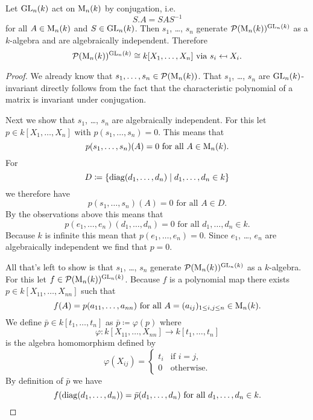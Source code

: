 \begin{thrm}
  Let $\operatorname{GL}_n(k)$ act on $\operatorname{M}_n(k)$ by conjugation, i.e.\
  \[
      S.A
    = SAS^{-1}
  \]
  for all $A \in \operatorname{M}_n(k)$ and $S \in \operatorname{GL}_n(k)$.
  Then $s_1$, \dots, $s_n$ generate $\mathcal{P}(\operatorname{M}_n(k))^{\operatorname{GL}_n(k)}$ as a $k$-algebra and are algebraically independent.
  Therefore
  \[
              \mathcal{P}(\operatorname{M}_n(k))^{\operatorname{GL}_n(k)}
    \cong     k[X_1, \dotsc, X_n]
    \text{ via }
              s_i
    \mapsfrom X_i.
  \]
\end{thrm}
\begin{proof}
  We already know that $s_1, \dotsc, s_n \in \mathcal{P}(\operatorname{M}_n(k))$.
  That $s_1$, \dots, $s_n$ are $\operatorname{GL}_n(k)$-invariant directly follows from the fact that the characteristic polynomial of a matrix is invariant under conjugation.
  
  Next we show that $s_1$, \dots, $s_n$ are algebraically independent.
  For this let $p \in k[X_1, \dotsc, X_n]$ with $p(s_1, \dotsc, s_n) = 0$.
  This means that
  \[
        p(s_1, \dotsc, s_n)(A)
    =   0
    \text{ for all }
        A
    \in \operatorname{M}_n(k).
  \]
  For
  \[
              D
    \coloneqq \{
                \operatorname{diag}(d_1, \dotsc, d_n)
              \mid
                    d_1, \dotsc, d_n
                \in k
              \}
  \]
  we therefore have
  \[
      p(s_1, \dotsc, s_n)(A)
    = 0
    \text{ for all }
        A
    \in D.
  \]
  By the observations above this means that 
  \[
      p(e_1, \dotsc, e_n)(d_1, \dotsc, d_n)
    = 0
    \text{ for all }
        d_1, \dotsc, d_n
    \in k.
  \]
  Because $k$ is infinite this mean that $p(e_1, \dotsc, e_n) = 0$.
  Since $e_1$, \dots, $e_n$ are algebraically independent we find that $p =0$.
  
  All that’s left to show is that $s_1$, \dots, $s_n$ generate $\mathcal{P}(\operatorname{M}_n(k))^{\operatorname{GL}_n(k)}$ as a $k$-algebra.
  For this let $f \in \mathcal{P}(\operatorname{M}_n(k))^{\operatorname{GL}_n(k)}$.
  Because $f$ is a polynomial map there exists $p \in k[X_{11}, \dotsc, X_{nn}]$ such that
  \[
      f(A)
    = p(a_{11}, \dotsc, a_{nn})
    \text{ for all }
        A
    =   (a_{ij})_{1 \leq i,j \leq n}
    \in \operatorname{M}_n(k).
  \]
  We define $\bar{p} \in k[t_1, \dotsc, t_n]$ as $\bar{p} \coloneqq \varphi(p)$ where
  \[
            \varphi
    \colon  k[X_{11}, \dotsc, X_{nn}]
    \to     k[t_1, \dotsc, t_n]
  \]
  is the algebra homomorphism defined by
  \[
      \varphi(X_{ij})
    = \begin{cases}
        t_i & \text{if } i = j, \\
          0 & \text{otherwise}.
      \end{cases}
  \]
  By definition of $\bar{p}$ we have
  \[
      f(\operatorname{diag}(d_1, \dotsc, d_n))
    = \bar{p}(d_1, \dotsc, d_n)
    \text{ for all }
        d_1, \dotsc, d_n
    \in k.
  \]
  

\end{proof}
